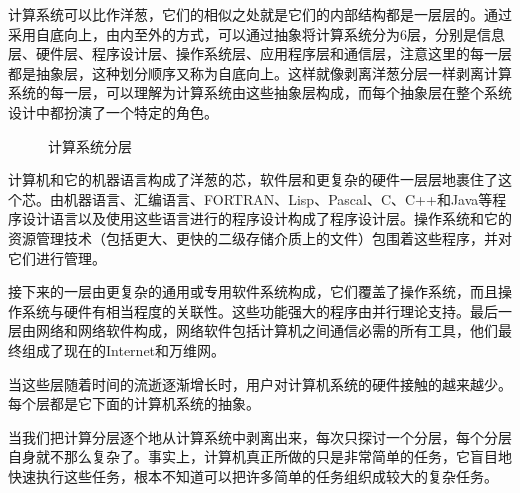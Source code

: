 计算系统可以比作洋葱，它们的相似之处就是它们的内部结构都是一层层的。通过采用自底向上，由内至外的方式，可以通过抽象将计算系统分为6层，分别是信息层、硬件层、程序设计层、操作系统层、应用程序层和通信层，注意这里的每一层都是抽象层，这种划分顺序又称为自底向上。这样就像剥离洋葱分层一样剥离计算系统的每一层，可以理解为计算系统由这些抽象层构成，而每个抽象层在整个系统设计中都扮演了一个特定的角色。
\begin{figure}[!h]
\centering
\caption{计算系统分层}
\label{计算系统分层}
\end{figure}

计算机和它的机器语言构成了洋葱的芯，软件层和更复杂的硬件一层层地裹住了这个芯。由机器语言、汇编语言、FORTRAN、Lisp、Pascal、C、C++和Java等程序设计语言以及使用这些语言进行的程序设计构成了程序设计层。操作系统和它的资源管理技术（包括更大、更快的二级存储介质上的文件）包围着这些程序，并对它们进行管理。

接下来的一层由更复杂的通用或专用软件系统构成，它们覆盖了操作系统，而且操作系统与硬件有相当程度的关联性。这些功能强大的程序由并行理论支持。最后一层由网络和网络软件构成，网络软件包括计算机之间通信必需的所有工具，他们最终组成了现在的Internet和万维网。

当这些层随着时间的流逝逐渐增长时，用户对计算机系统的硬件接触的越来越少。每个层都是它下面的计算机系统的抽象。

当我们把计算分层逐个地从计算系统中剥离出来，每次只探讨一个分层，每个分层自身就不那么复杂了。事实上，计算机真正所做的只是非常简单的任务，它盲目地快速执行这些任务，根本不知道可以把许多简单的任务组织成较大的复杂任务。

